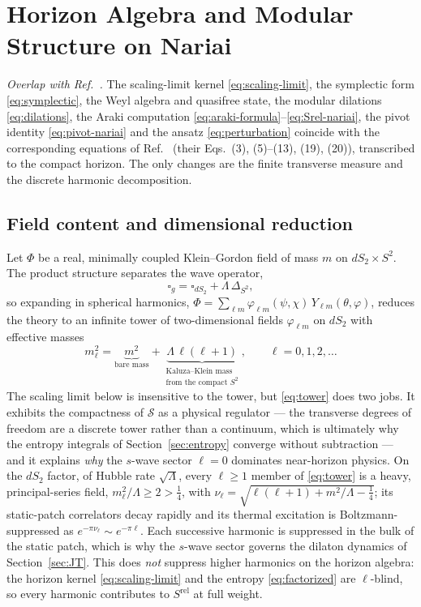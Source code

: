 \documentclass[11pt]{article}
\newcommand{\Srel}{S^{\mathrm{rel}}}
\newcommand{\Nariai}{Nariai}
\begin{document}
\section{Horizon Algebra and Modular Structure on \Nariai{}}
\label{sec:algebra}

\noindent\emph{Overlap with Ref.~\cite{DorauMuch}.} The scaling-limit kernel \eqref{eq:scaling-limit}, the symplectic form \eqref{eq:symplectic}, the Weyl algebra and quasifree state, the modular dilations \eqref{eq:dilations}, the Araki computation \eqref{eq:araki-formula}--\eqref{eq:Srel-nariai}, the pivot identity \eqref{eq:pivot-nariai} and the ansatz \eqref{eq:perturbation} coincide with the corresponding equations of Ref.~\cite{DorauMuch} (their Eqs.~(3), (5)--(13), (19), (20)), transcribed to the compact horizon. The only changes are the finite transverse measure and the discrete harmonic decomposition.

\subsection{Field content and dimensional reduction}

Let $\Phi$ be a real, minimally coupled Klein--Gordon field of mass $m$ on $dS_2 \times S^2$. The product structure separates the wave operator,
\begin{equation}
\square_g = \square_{dS_2} + \Lambda\, \Delta_{S^2},
\end{equation}
so expanding in spherical harmonics, $\Phi = \sum_{\ell m} \varphi_{\ell m}(\psi,\chi)\, Y_{\ell m}(\theta,\varphi)$, reduces the theory to an infinite tower of two-dimensional fields $\varphi_{\ell m}$ on $dS_2$ with effective masses
\begin{equation}
m_\ell^2 = \underbrace{m^2}_{\text{bare mass}} + \underbrace{\Lambda\,\ell(\ell+1)}_{\substack{\text{Kaluza--Klein mass}\\ \text{from the compact } S^2}}, \qquad \ell = 0, 1, 2, \dots
\label{eq:tower}
\end{equation}
The scaling limit below is insensitive to the tower, but \eqref{eq:tower} does two jobs. It exhibits the compactness of $\mathcal{S}$ as a physical regulator --- the transverse degrees of freedom are a discrete tower rather than a continuum, which is ultimately why the entropy integrals of Section~\ref{sec:entropy} converge without subtraction --- and it explains \emph{why} the $s$-wave sector $\ell = 0$ dominates near-horizon physics. On the $dS_2$ factor, of Hubble rate $\sqrt{\Lambda}$, every $\ell \ge 1$ member of \eqref{eq:tower} is a heavy, principal-series field, $m_\ell^2/\Lambda \ge 2 > \tfrac{1}{4}$, with $\nu_\ell = \sqrt{\ell(\ell+1) + m^2/\Lambda - \tfrac{1}{4}}$; its static-patch correlators decay rapidly and its thermal excitation is Boltzmann-suppressed as $e^{-\pi\nu_\ell} \sim e^{-\pi\ell}$. Each successive harmonic is suppressed in the bulk of the static patch, which is why the $s$-wave sector governs the dilaton dynamics of Section~\ref{sec:JT}. This does \emph{not} suppress higher harmonics on the horizon algebra: the horizon kernel \eqref{eq:scaling-limit} and the entropy \eqref{eq:factorized} are $\ell$-blind, so every harmonic contributes to $\Srel$ at full weight.
\end{document}

